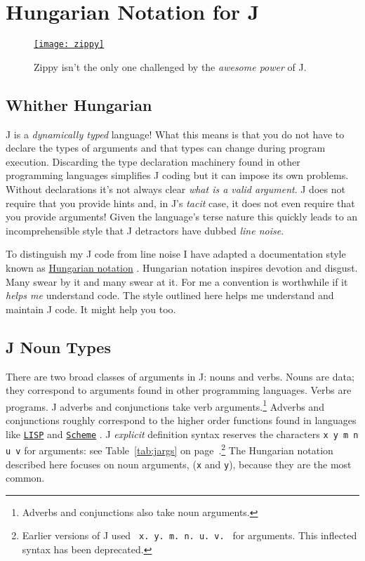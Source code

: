 \section{Hungarian Notation for J}\label{ap:jodhung}
   
\begin{figure}[htbp]
  \centering
  \href{http://www.zippythepinhead.com/}{\texttt{[image: zippy]}}
  \caption[Zippy the Pinhead]{Zippy \cite{zippy} isn't the only one challenged by the \emph{awesome power} of J.}
  \label{eps:zippy}
\end{figure}

\subsection{Whither Hungarian}

J is a \emph{dynamically typed} language!  What this means is that
you do not have to declare the types of arguments and that types
can change during program execution.  Discarding the 
type declaration machinery found in other programming languages simplifies
J coding but it can impose its own problems. Without declarations
it's not always clear \emph{what is a valid argument}.  J does
not require that you provide hints and, in J's \emph{tacit} case, it
does not even require that you provide arguments!  Given
the language's terse nature this quickly leads to an incomprehensible
style that J detractors have dubbed \emph{line noise}. 

To distinguish my J code from line noise I have adapted a documentation
style known as \href{https://en.wikipedia.org/wiki/Hungarian_notation}{Hungarian notation} \cite{wiki:hung}. 
 Hungarian notation inspires devotion and disgust.  Many swear by it and many
 swear at it.  For me a
convention is worthwhile if it \emph{helps me} understand code.  The style
outlined here helps me understand and maintain J code.  It might help you too.

\subsection{J Noun Types}

There are two broad classes of arguments in J: nouns and verbs.  Nouns are data;
they correspond to arguments found in other programming languages.  Verbs are programs.  J adverbs
and conjunctions take verb arguments.\footnote{Adverbs and conjunctions also take noun
arguments.} Adverbs and conjunctions roughly correspond to the
higher order functions found in languages like
\href{https://www.cs.cmu.edu/Groups/AI/html/cltl/cltl2.html}{\texttt{LISP}} \cite{commonlisp} and
\href{https://www-swiss.ai.mit.edu/projects/scheme/}{\texttt{Scheme}} \cite{scheme}. 
J \emph{explicit} definition syntax reserves the characters \texttt{x y m n
u v} for arguments: see Table~\ref{tab:jargs} on page~\pageref{tab:jargs}.\footnote{
Earlier versions of J used  \texttt{ x.\ y.\ m.\ n.\ u.\ v.\ } for arguments.  This inflected
syntax has been deprecated.} The Hungarian notation described here focuses on noun arguments, 
(\texttt{x} and \texttt{y}), because they are the most common.


